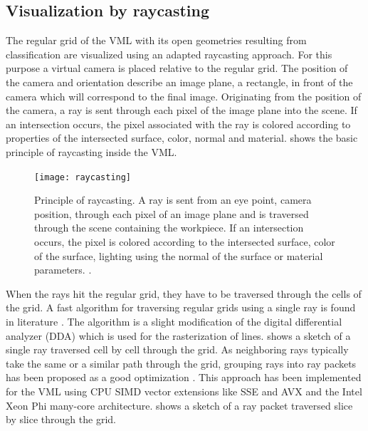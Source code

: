 \subsection{Visualization by raycasting}
\label{sec:raycasting}

The regular grid of the VML with its open geometries resulting from classification are visualized using an adapted raycasting approach.
For this purpose a virtual camera is placed relative to the regular grid.
The position of the camera and orientation describe an image plane, \ie a rectangle, in front of the camera which will correspond to the final image.
Originating from the position of the camera, a ray is sent through each pixel of the image plane into the scene.
If an intersection occurs, the pixel associated with the ray is colored according to properties of the intersected surface, \eg color, normal and material.
 shows the basic principle of raycasting inside the VML.

\begin{figure}
	\centering
	\texttt{[image: raycasting]}
	\caption[Raycasting principle]{
		Principle of raycasting.
		A ray is sent from an eye point, \ie camera position, through each pixel of an image plane and is traversed through the scene containing the workpiece.
		If an intersection occurs, the pixel is colored according to the intersected surface, \protect\eg color of the surface, lighting using the normal of the surface or material parameters.
		\cite{enlight_demo_workshop}.
	}
	\label{fig:raycasting_principle}
\end{figure}

When the rays hit the regular grid, they have to be traversed through the cells of the grid.
A fast algorithm for traversing regular grids using a single ray is found in literature \cite{3DDDA}.
The algorithm is a slight modification of the digital differential analyzer (DDA) which is used for the rasterization of lines.
 shows a sketch of a single ray traversed cell by cell through the grid.
%
As neighboring rays typically take the same or a similar path through the grid, grouping rays into ray packets has been proposed as a good optimization \cite{packet_caster}.
This approach has been implemented for the VML using CPU SIMD vector extensions like SSE and AVX  \cite{enlight} and the Intel Xeon Phi many-core architecture.
 shows a sketch of a ray packet traversed slice by slice through the grid.

